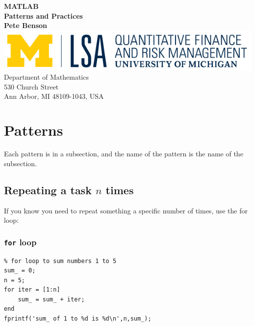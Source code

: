 \documentclass{report}[11pt]
\newcommand{\code}[1]{\texttt{#1}}
\begin{document}
\begin{titlepage}
\begin{center}
 {\huge\bfseries MATLAB\\ Patterns and Practices\\}
 \vspace{1.5cm}
 {\bfseries Pete Benson}\\[5pt]
 \vspace{10cm}
\includegraphics{QFRM_rgb}\\[5pt]
{Department of Mathematics}\\[5pt]
{530 Church Street}\\[5pt]
{Ann Arbor, MI 48109-1043,
 USA}\\
 \vfill

\end{center}
\end{titlepage}

\chapter{Patterns}

Each pattern is in a subsection, and the name of the pattern is the name of the subsection.

\section{Repeating a task $n$ times}
If you know you need to repeat something a specific number of times, use the for loop:

\subsection{\code{for} loop}
\begin{lstlisting}
% for loop to sum numbers 1 to 5
sum_ = 0;
n = 5;
for iter = [1:n]
    sum_ = sum_ + iter;
end
fprintf('sum_ of 1 to %d is %d\n',n,sum_);
\end{lstlisting}
\pagebreak
\end{document}
